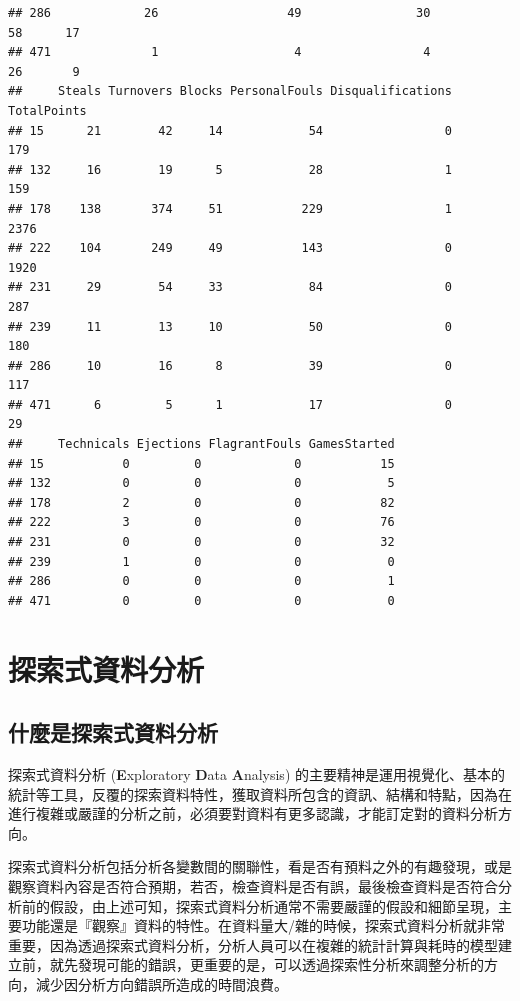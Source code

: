 \documentclass[]{book}
\theoremstyle{definition}
\theoremstyle{definition}
\theoremstyle{remark}
\begin{document}
\begin{verbatim}
## 286             26                  49                30            58      17
## 471              1                   4                 4            26       9
##     Steals Turnovers Blocks PersonalFouls Disqualifications TotalPoints
## 15      21        42     14            54                 0         179
## 132     16        19      5            28                 1         159
## 178    138       374     51           229                 1        2376
## 222    104       249     49           143                 0        1920
## 231     29        54     33            84                 0         287
## 239     11        13     10            50                 0         180
## 286     10        16      8            39                 0         117
## 471      6         5      1            17                 0          29
##     Technicals Ejections FlagrantFouls GamesStarted
## 15           0         0             0           15
## 132          0         0             0            5
## 178          2         0             0           82
## 222          3         0             0           76
## 231          0         0             0           32
## 239          1         0             0            0
## 286          0         0             0            1
## 471          0         0             0            0
\end{verbatim}

\chapter{探索式資料分析}\label{eda}

\section{什麼是探索式資料分析}

探索式資料分析 (\textbf{E}xploratory \textbf{D}ata \textbf{A}nalysis)
的主要精神是運用視覺化、基本的統計等工具，反覆的探索資料特性，獲取資料所包含的資訊、結構和特點，因為在進行複雜或嚴謹的分析之前，必須要對資料有更多認識，才能訂定對的資料分析方向。

探索式資料分析包括分析各變數間的關聯性，看是否有預料之外的有趣發現，或是觀察資料內容是否符合預期，若否，檢查資料是否有誤，最後檢查資料是否符合分析前的假設，由上述可知，探索式資料分析通常不需要嚴謹的假設和細節呈現，主要功能還是『觀察』資料的特性。在資料量大/雜的時候，探索式資料分析就非常重要，因為透過探索式資料分析，分析人員可以在複雜的統計計算與耗時的模型建立前，就先發現可能的錯誤，更重要的是，可以透過探索性分析來調整分析的方向，減少因分析方向錯誤所造成的時間浪費。
\end{document}
